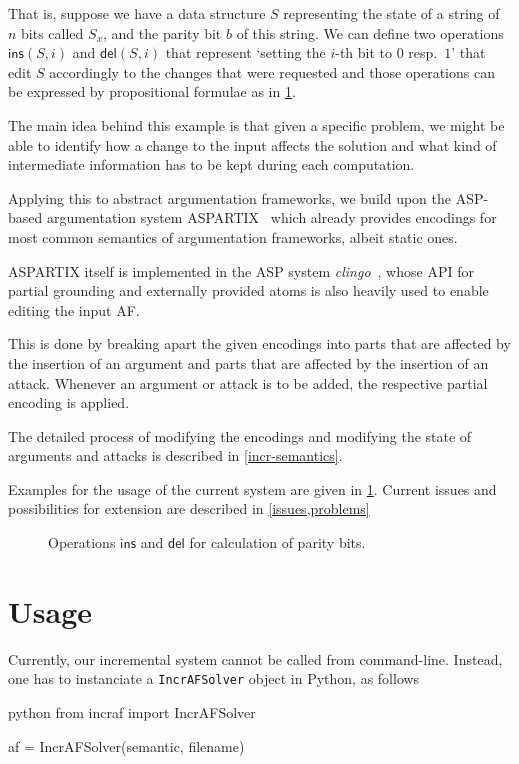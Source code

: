 \documentclass[oneside,12pt]{amsart}
\begin{document}
That is, suppose we have a data structure $S$ representing the state of a
string of $n$ bits called $S_x$, and the parity bit $b$ of this string.
We can define two operations $\mathsf{ins}(S,i)$ and $\mathsf{del}(S,i)$ 
that represent `setting the $i$-th bit to $0$ resp.\ $1$' that edit $S$ 
accordingly to the changes that were requested and those operations 
can be expressed by propositional formulae as in \cref{dynfo-parity}.

The main idea behind this example is that given a specific problem, we 
might be able to identify how a change to the input affects the solution 
and what kind of intermediate information has to be kept during each computation.

Applying this to abstract argumentation frameworks, we build upon the 
ASP-based argumentation system ASPARTIX~\cite{aspartix} which already 
provides encodings for most common semantics of argumentation frameworks, albeit static ones.

ASPARTIX itself is implemented in the ASP system \emph{clingo}~\cite{clingo}, whose API 
for partial grounding and externally provided atoms is also heavily used 
to enable editing the input AF.

This is done by breaking apart the given encodings into parts that are affected
by the insertion of an argument and parts that are affected by the 
insertion of an attack. Whenever an argument or attack is to be added,
the respective partial encoding is applied. 

The detailed process of modifying the encodings and modifying 
the state of arguments and attacks is described in \cref{incr-semantics}.

Examples for the usage of the current system are given in \cref{usage}.
Current issues and possibilities for extension are described in \cref{issues,problems}

\begin{figure}
    
    \caption{Operations $\mathsf{ins}$ and $\mathsf{del}$ for calculation of parity bits.}
    \label{dynfo-parity}
\end{figure}

\section{Usage}\label{usage}
Currently, our incremental system cannot be called from command-line. Instead, one has to 
instanciate a \texttt{IncrAFSolver} object in Python, as follows
\begin{mintedbox}{python}
from incraf import IncrAFSolver

af = IncrAFSolver(semantic, filename)\end{mintedbox}
\end{document}
